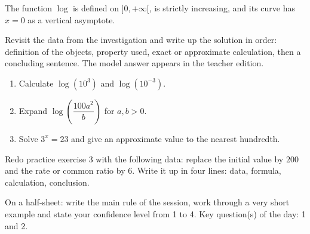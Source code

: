 \begin{traceecrite}The function $\log$ is defined on $]0,+\infty[$, is strictly increasing, and its curve has $x=0$ as a vertical asymptote.\end{traceecrite}

\begin{exemple}
Revisit the data from the investigation and write up the solution in order: definition of the objects, property used, exact or approximate calculation, then a concluding sentence. The model answer appears in the teacher edition.
\end{exemple}
\enseignant{The logarithm is the inverse function of $10^x$: domain $]0,+\infty[$, strictly increasing, asymptote $x=0$.}

\begin{exercice}[-- essentiel]
\begin{enumerate}\item Calculate $\log(10^3)$ and $\log(10^{-3})$.\item Expand $\log\!\left(\dfrac{100a^2}{b}\right)$ for $a,b>0$.\item Solve $3^x=23$ and give an approximate value to the nearest hundredth.\end{enumerate}
\end{exercice}


\begin{dm}Redo practice exercise 3 with the following data: replace the initial value by $200$ and the rate or common ratio by $6$. Write it up in four lines: data, formula, calculation, conclusion.\end{dm}

\begin{sortie}On a half-sheet: write the main rule of the session, work through a very short example and state your confidence level from 1 to 4. Key question(s) of the day: 1 and 2.\end{sortie}


